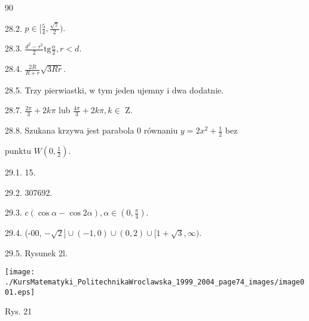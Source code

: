\documentclass[a4paper,12pt]{article}
\begin{document}
90

28.2. $ p\in [\displaystyle \frac{5}{4},\frac{\sqrt{7}}{2}).$

28.3. $\displaystyle \frac{d^{2}-r^{2}}{2}\mathrm{t}\mathrm{g}\frac{\alpha}{2}, r<d.$

28.4. $\displaystyle \frac{2R}{R+r}\sqrt{3Rr}.$

28.5. Trzy pierwiastki, $\mathrm{w}$ tym jeden ujemny $\mathrm{i}$ dwa dodatnie.

28.7. $\displaystyle \frac{2\pi}{3}+2k\pi$ lub $\displaystyle \frac{4\pi}{3}+2k\pi,  k\in$ Z.

28.8. Szukana krzywa jest parabola $0$ równaniu $y = 2x^{2}+ \displaystyle \frac{1}{2}$ bez

punktu $W(0,\displaystyle \frac{1}{2}).$

29.1. 15.

29.2. 307692.

29.3. $c(\cos\alpha-\cos 2\alpha), \alpha\in (0,\displaystyle \frac{\pi}{4}).$

29.4. (-00, $-\sqrt{2}]\cup(-1,0)\cup(0,2)\cup[1+\sqrt{3},\infty).$

29.5. Rysunek 2l.
\begin{center}
\texttt{[image: ./KursMatematyki\_PolitechnikaWroclawska\_1999\_2004\_page74\_images/image001.eps]}
\end{center}
Rys. 21
\end{document}
